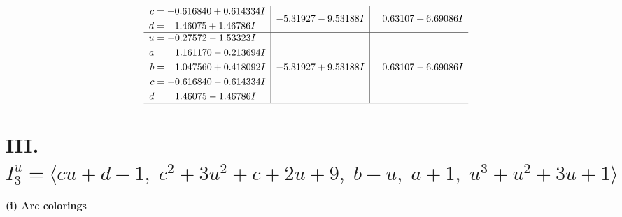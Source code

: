\documentclass[1p]{elsarticle_modified}
\theoremstyle{definition}
\begin{document}
$$\begin{array}{c|c|c}
\begin{aligned}
c &= -0.616840 + 0.614334 I \\
d &= \phantom{-}1.46075 + 1.46786 I\end{aligned}
 & -5.31927 - 9.53188 I & \phantom{-}0.63107 + 6.69086 I \\ \hline\begin{aligned}
u &= -0.27572 - 1.53323 I \\
a &= \phantom{-}1.161170 - 0.213694 I \\
b &= \phantom{-}1.047560 + 0.418092 I \\
c &= -0.616840 - 0.614334 I \\
d &= \phantom{-}1.46075 - 1.46786 I\end{aligned}
 & -5.31927 + 9.53188 I & \phantom{-}0.63107 - 6.69086 I\\
 \hline 
 \end{array}$$\newpage\newpage\renewcommand{\arraystretch}{1}
\centering \section*{III. $I^u_{3}= \langle c u+d-1,\;c^2+3 u^2+c+2 u+9,\;b- u,\;a+1,\;u^3+u^2+3 u+1 \rangle$}
\flushleft \textbf{(i) Arc colorings}\\
\end{document}
